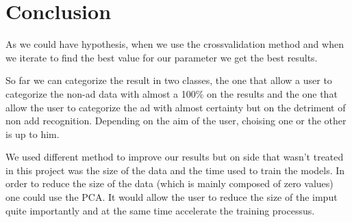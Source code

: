 \section{Conclusion}

As we could have hypothesis, when we use the crossvalidation method and when we iterate to find the best value for our parameter we get the best results.

So far we can categorize the result in two classes, the one that allow a user to categorize the non-ad data with almost a 100\% on the results and the one that allow the user to categorize the ad with almost certainty but on the detriment of non add recognition. Depending on the aim of the user, choising one or the other is up to him.

We used different method to improve our results but on side that wasn't treated in this project was the size of the data and the time used to train the models. In order to reduce the size of the data (which is mainly composed of zero values) one could use the PCA. It would allow the user to reduce the size of the imput quite importantly and at the same time accelerate the training processus.
